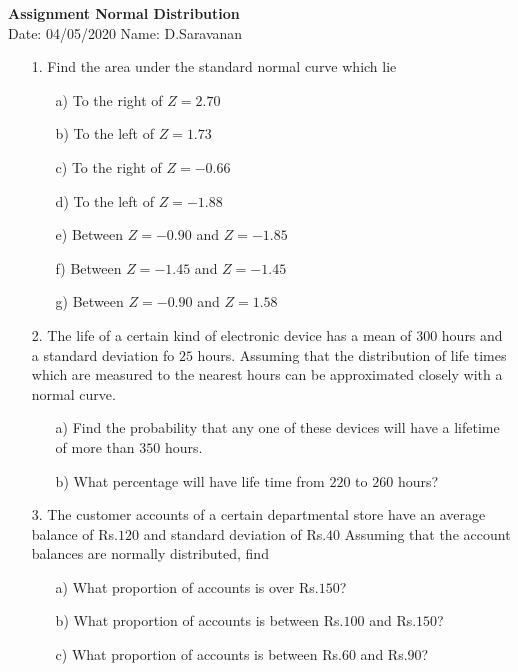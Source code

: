 \documentclass[a4paper,11pt,openright]{report}
\begin{document}
\singlespacing
\pagestyle{plain}

\begin{center}
\textbf{Assignment Normal Distribution} \\
Date: 04/05/2020 \hspace{2mm} Name: D.Saravanan
\end{center}

\vspace{10px}

\begin{enumerate}

\item[1.] Find the area under the standard normal curve which lie 

\begin{enumerate}

\item[a)] To the right of $Z = 2.70$
\item[b)] To the left of $Z = 1.73$
\item[c)] To the right of $Z = -0.66$
\item[d)] To the left of $Z = -1.88$
\item[e)] Between $Z = -0.90$ and $Z = -1.85$
\item[f)] Between $Z = -1.45$ and $Z = -1.45$
\item[g)] Between $Z = -0.90$ and $Z = 1.58$

\end{enumerate}

\item[2.] The life of a certain kind of electronic device has a mean of $300$ hours and a
standard deviation fo $25$ hours. Assuming that the distribution of life times which are
measured to the nearest hours can be approximated closely with a normal curve.

\begin{enumerate}

\item[a)] Find the probability that any one of these devices will have a lifetime of more
than $350$ hours.
\item[b)] What percentage will have life time from $220$ to $260$ hours?

\end{enumerate}

\item[3.] The customer accounts of a certain departmental store have an average balance of
Rs.$120$ and standard deviation of Rs.$40$ Assuming that the account balances are normally
distributed, find

\begin{enumerate}

\item[a)] What proportion of accounts is over Rs.$150$?
\item[b)] What proportion of accounts is between Rs.$100$ and Rs.$150$?
\item[c)] What proportion of accounts is between Rs.$60$ and Rs.$90$?

\end{enumerate}

\end{enumerate}
\end{document}
